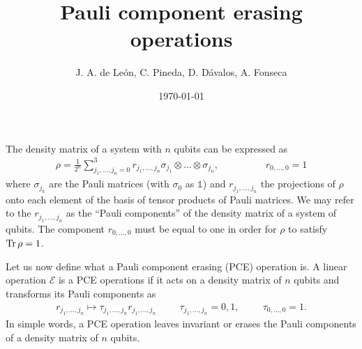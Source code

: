 \documentclass[11pt,dvipsnames]{article} %
\newcommand{\1}{\mathds{1}}
\begin{document}
\title{Pauli component erasing operations} 
\author{J. A. de León, C. Pineda, D. Dávalos, A. Fonseca}
\date{\today}  
\maketitle
The density matrix of a system with $n$ qubits can be expressed as 
\begin{align}\label{eq:rho_nQubits_pauliBasis}
\rho =\frac{1}{2^n} \sum_{j_1,\ldots,j_n=0}^3r_{j_1,\ldots,j_n}
\sigma_{j_1}\otimes \ldots \otimes \sigma_{j_n},\hspace{2cm} r_{0,\ldots,0}=1
\end{align}
where $\sigma_{j_k}$ are the Pauli matrices (with $\sigma_0$ as $\1$)
and $r_{j_1,\ldots,j_n}$ the projections of $\rho$ onto each element of 
the basis of tensor products of Pauli matrices. We may refer to the 
$r_{j_1,\ldots,j_n}$ as the ``Pauli components'' of the density matrix 
of a system of qubits.  The component $r_{0,\ldots,0}$
must be equal to one in order for $\rho$ to satisfy $\Tr \rho =1$. 

Let us now define what a Pauli component erasing (PCE) operation is. 
A linear operation $\mathcal{E}$ is a PCE operations if it 
acts on a density matrix of $n$ qubits and transforms its Pauli components as
\begin{align}\label{eq:PCE-definition}
r_{j_1,\ldots,j_n} \longmapsto \tau_{j_1,\ldots,j_n}r_{j_1,\ldots,j_n}
\hspace{1cm} \tau_{j_1,\ldots,j_n}=0,1,
\hspace{1cm} \tau_{0,\ldots,0}=1.
\end{align}
In simple words, a PCE operation leaves invariant or erases the Pauli 
components of a density matrix of $n$ qubits.
\end{document}
